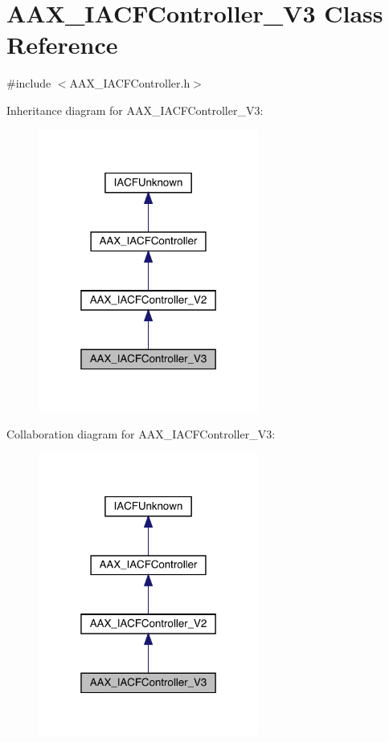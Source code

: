 \hypertarget{a01645}{}\section{A\+A\+X\+\_\+\+I\+A\+C\+F\+Controller\+\_\+\+V3 Class Reference}
\label{a01645}


{\ttfamily \#include $<$A\+A\+X\+\_\+\+I\+A\+C\+F\+Controller.\+h$>$}



Inheritance diagram for A\+A\+X\+\_\+\+I\+A\+C\+F\+Controller\+\_\+\+V3\+:
\nopagebreak
\begin{figure}[H]
\begin{center}
\leavevmode
\includegraphics[width=205pt]{a01644}
\end{center}
\end{figure}


Collaboration diagram for A\+A\+X\+\_\+\+I\+A\+C\+F\+Controller\+\_\+\+V3\+:
\nopagebreak
\begin{figure}[H]
\begin{center}
\leavevmode
\includegraphics[width=205pt]{a01643}
\end{center}
\end{figure}


